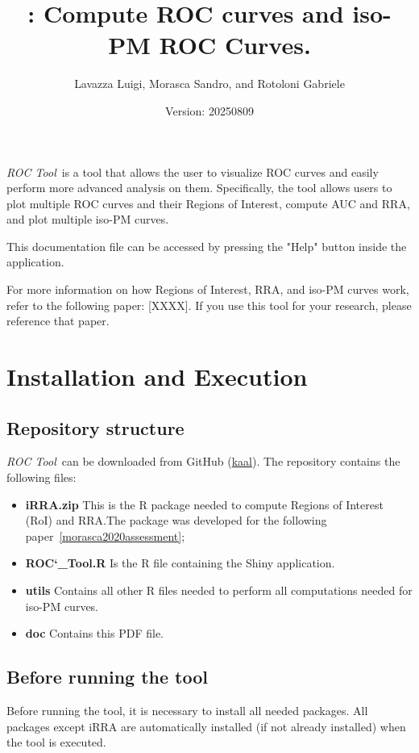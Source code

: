 \documentclass{article}
\title{\toolname: Compute ROC curves and iso-PM ROC Curves.}
\author{Lavazza Luigi, Morasca Sandro, and Rotoloni Gabriele}
\date{Version: 20250809}
\newcommand{\toolnameITB}{\textit{ROC Tool}~}
\newcommand{\mainfilenameNO}{ROC\char`_Tool.R}
\begin{document}
	
	\maketitle
	
	\toolnameITB is a tool that allows the user to visualize ROC curves and easily perform more advanced analysis on them. Specifically, the tool allows users to plot multiple ROC curves and their Regions of Interest, compute AUC and RRA, and plot multiple iso-PM curves.
	
	This documentation file can be accessed by pressing the "Help" button inside the application.
	
	For more information on how Regions of Interest, RRA, and iso-PM curves work, refer to the following paper: [XXXX]. If you use this tool for your research, please reference that paper.
	
	\newpage
	
	\tableofcontents
	
	\newpage
	
	\section{Installation and Execution}
	
	\subsection{Repository structure}
	\toolnameITB can be downloaded from GitHub (\url{kaal}). The repository contains the following files:
	\begin{itemize}
		\item \textbf{iRRA.zip} This is the R package needed to compute Regions of Interest (RoI) and RRA.The package was developed for the following paper~\ref{morasca2020assessment};
		\item \textbf{\mainfilenameNO} Is the R file containing the Shiny application.
		\item \textbf{utils} Contains all other R files needed to perform all computations needed for iso-PM curves.
		\item \textbf{doc} Contains this PDF file.
	\end{itemize}
	
	\subsection{Before running the tool}
	Before running the tool, it is necessary to install all needed packages.
	All packages except iRRA are automatically installed (if not already installed) when the tool is executed.
	
\end{document}
